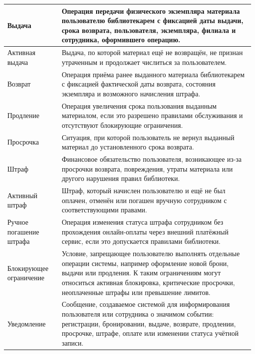 \documentclass[12pt,a4paper]{article}
\begin{document}
\begin{xltabular}{\textwidth}{
			|>{\raggedright\arraybackslash}p{4.2cm}
			|>{\raggedright\arraybackslash}X|
		}
		Выдача & Операция передачи физического экземпляра материала пользователю
		библиотекарем с фиксацией даты выдачи, срока возврата, пользователя,
		экземпляра, филиала и сотрудника, оформившего операцию. \\
		\hline
		
		Активная выдача & Выдача, по которой материал ещё не возвращён,
		не признан утраченным и продолжает числиться за пользователем. \\
		\hline
		
		Возврат & Операция приёма ранее выданного материала библиотекарем
		с фиксацией фактической даты возврата, состояния экземпляра и возможного
		начисления штрафа. \\
		\hline
		
		Продление & Операция увеличения срока пользования выданным материалом,
		если это разрешено правилами обслуживания и отсутствуют блокирующие
		ограничения. \\
		\hline
		
		Просрочка & Ситуация, при которой пользователь не вернул выданный
		материал до установленного срока возврата. \\
		\hline
		
		Штраф & Финансовое обязательство пользователя, возникающее из-за
		просрочки возврата, повреждения, утраты материала или другого нарушения
		правил библиотеки. \\
		\hline
		
		Активный штраф & Штраф, который начислен пользователю и ещё не был
		оплачен, отменён или погашен вручную сотрудником с соответствующими
		правами. \\
		\hline
		
		Ручное погашение штрафа & Операция изменения статуса штрафа сотрудником
		без прохождения онлайн-оплаты через внешний платёжный сервис, если это
		допускается правилами библиотеки. \\
		\hline
		
		Блокирующее ограничение & Условие, запрещающее пользователю выполнять
		отдельные операции системы, например оформление новой брони, выдачи
		или продления. К таким ограничениям могут относиться активная блокировка,
		критические просрочки, неоплаченные штрафы или превышение лимитов. \\
		\hline
		
		Уведомление & Сообщение, создаваемое системой для информирования
		пользователя или сотрудника о значимом событии: регистрации, бронировании,
		выдаче, возврате, продлении, просрочке, штрафе, оплате или изменении
		статуса учётной записи. \\
		\hline
		

\end{xltabular}
\end{document}
